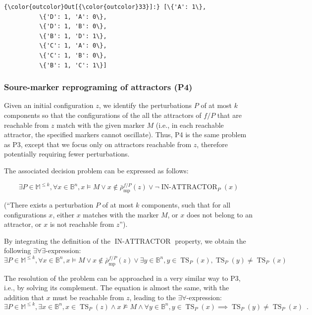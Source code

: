 \documentclass[PCJ,Unicode,screen,mode=plain]{cedram}
\begin{document}
\begin{small}
\begin{Verbatim}[commandchars=\\\{\}]
{\color{outcolor}Out[{\color{outcolor}33}]:} [\{'A': 1\},
          \{'D': 1, 'A': 0\},
          \{'D': 1, 'B': 0\},
          \{'B': 1, 'D': 1\},
          \{'C': 1, 'A': 0\},
          \{'C': 1, 'B': 0\},
          \{'B': 1, 'C': 1\}]
\end{Verbatim}
\end{small}
\hypertarget{soure-marker-reprograming-of-attractors-p4}{%
\subsubsection{Soure-marker reprograming of attractors
(P4)}\label{soure-marker-reprograming-of-attractors-p4}}

Given an initial configuration \(z\), we identify the perturbations
\(P\) of at most \(k\) components so that the configurations of the all
the attractors of \(f/P\) that are reachable from \(z\) match with the
given marker \(M\) (i.e., in each reachable attractor, the specified
markers cannot oscillate). Thus, P4 is the same problem as P3, except
that we focus only on attractors reachable from \(z\), therefore
potentially requiring fewer perturbations.

The associated decision problem can be expressed as follows:

\begin{equation}
    \exists P\in\mathbb M^{\leq k}, \forall x\in\mathbb B^n, x\models M \vee x\notin\bar\rho^{f/P}_{\mathrm{mp}}(z)  \vee \neg\operatorname{IN-ATTRACTOR}_P(x)
\end{equation}

(``There exists a perturbation \(P\) of at most \(k\) components, such
that for all configurations \(x\), either \(x\) matches with the marker
\(M\), or \(x\) does not belong to an attractor, or \(x\) is not
reachable from \(z\)'').

By integrating the definition of the \(\operatorname{IN-ATTRACTOR}\)
property, we obtain the following \(\exists\forall\exists\)-expression:
\begin{equation}
    \exists P\in\mathbb M^{\leq k}, \forall x\in\mathbb B^n, x\models M \vee x\notin\bar\rho^{f/P}_{\mathrm{mp}}(z) \vee \exists y\in\mathbb B^n,
   y\in \operatorname{TS}_P(x), \operatorname{TS}_P(y) \neq \operatorname{TS}_P(x)
\end{equation}

The resolution of the problem can be approached in a very similar way to
P3, i.e., by solving its complement. The equation is almost the same,
with the addition that \(x\) must be reachable from \(z\), leading to
the \(\exists\forall\)-expression: \begin{equation}
    \exists P\in\mathbb M^{\leq k}, \exists x\in\mathbb B^n, x\in\operatorname{TS}_P(z) \wedge x\not\models M\wedge \forall y\in\mathbb B^n, y\in \operatorname{TS}_P(x) \implies \operatorname{TS}_P(y) \neq \operatorname{TS}_P(x)
\enspace.
\end{equation}
\end{document}
